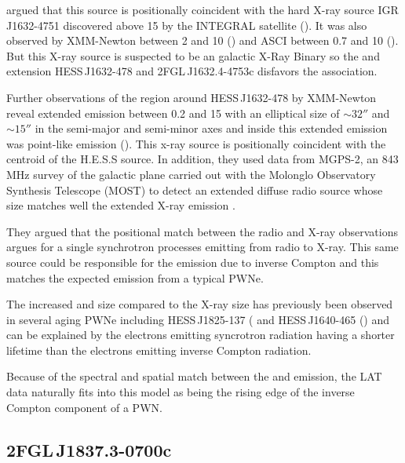 \documentclass[12pt,preprint]{aastex}
\newcommand{\kev}{\text{Kev}\xspace}
\newcommand{\gev}{\text{GeV}\xspace}
\newcommand{\tev}{\text{TeV}\xspace}
\renewcommand{\approx}{\sim\!\xspace}
\begin{document}
\cite{hess_plane_survey} argued that this source is positionally
coincident with the hard X-ray source IGR\,J1632-4751 discovered above
15 \kev by the INTEGRAL satellite (\cite{Igr_J16320-4751_circ}).
It was also observed by XMM-Newton between 2 and 10 \kev
(\cite{xmm_newton_IGR_J16320-4751}) and ASCI between 0.7 and 10 \kev
(\cite{asca_plane_survey}).  But this X-ray source is suspected to be
an galactic X-Ray Binary so the \gev and \tev extension HESS\,J1632-478
and 2FGL\,J1632.4-4753c disfavors the association.

Further observations of the region around HESS\,J1632-478 by XMM-Newton
reveal extended emission between 0.2 \kev and 15 \kev with an elliptical
size of $\approx32''$ and $\approx15''$ in the semi-major and semi-minor
axes and inside this extended emission was point-like emission
(\cite{hess_j1632_478_xmm_newton}).  This x-ray source is positionally
coincident with the \tev centroid of the H.E.S.S source.  In addition,
they used data from MGPS-2, an 843 MHz survey of the galactic plane
carried out with the Molonglo Observatory Synthesis Telescope (MOST)
to detect an extended diffuse radio source whose size matches well the
extended X-ray emission \cite{most_survey_galactic_plane}.

They argued that the positional match between the radio and X-ray
observations argues for a single synchrotron processes emitting from
radio to X-ray.  This same source could be responsible for the \tev
emission due to inverse Compton and this matches the expected emission
from a typical PWNe.

The increased \gev and \tev size compared to the X-ray size
has previously been observed in several aging PWNe including 
HESS\,J1825-137 (\cite{hess_j1825_xmm_newton,hess_j1825_hess} and HESS\,J1640-465
(\cite{hess_plane_survey,xmm_newton_hess_j_1640-466}) and can be explained
by the electrons emitting syncrotron radiation having a shorter lifetime
than the electrons emitting inverse Compton radiation.

Because of the spectral and spatial match between the \gev and \tev
emission, the LAT data naturally fits into this model as being the rising
edge of the inverse Compton component of a PWN.

\subsection{2FGL\,J1837.3-0700c}
\label{section_2FGL_J1837.3-0700c}

\end{document}
